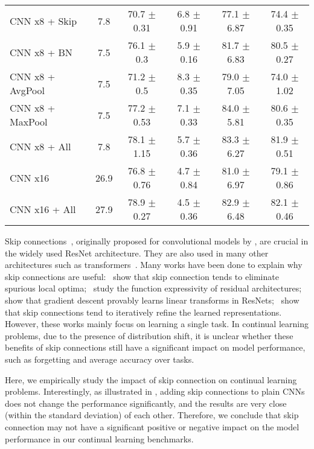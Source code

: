 \begin{table}[t]
{\begin{tabular}{@{}lccccc@{}}
CNN x8 + Skip & 7.8 & 70.7 $\pm$0.31 & 6.8 $\pm$0.91 & 77.1 $\pm$6.87 & 74.4 $\pm$0.35 \\
CNN x8 + BN & 7.5 & 76.1 $\pm$0.3 & 5.9 $\pm$0.16 & 81.7 $\pm$6.83 & 80.5 $\pm$0.27 \\
CNN x8 + AvgPool & 7.5 & 71.2 $\pm$0.5 & 8.3 $\pm$0.35 & 79.0 $\pm$7.05 & 74.0 $\pm$1.02 \\
CNN x8 + MaxPool & 7.5 & 77.2 $\pm$0.53 & 7.1 $\pm$0.33 & 84.0 $\pm$5.81 & 80.6 $\pm$0.35 \\
CNN x8 + All & 7.8 & 78.1 $\pm$1.15 & 5.7 $\pm$0.36 & 83.3 $\pm$6.27 & 81.9 $\pm$0.51 \\ \midrule
CNN x16 & 26.9 & 76.8 $\pm$0.76 & 4.7 $\pm$0.84 & 81.0 $\pm$6.97 & 79.1 $\pm$0.86 \\
CNN x16 + All & 27.9 & 78.9 $\pm$0.27 & 4.5 $\pm$0.36 & 82.9 $\pm$6.48 & 82.1 $\pm$0.46 \\ \bottomrule
\end{tabular}%
}
\negspace{-2mm}
\end{table}

Skip connections~\citep{Cho-Skip-DBM}, originally proposed for convolutional models by \citet{he2016deep}, are crucial in the widely used ResNet architecture. They are also used in many other architectures such as transformers~\citep{vaswani2017attention}. Many works have been done to explain why skip connections are useful:~\citet{hardt2016identity} show that skip connection tends to eliminate spurious local optima;~\citet{bartlett2018representing} study the function expressivity of residual architectures;~\citet{bartlett2018gradient} show that gradient descent provably learns linear transforms in ResNets;~\citet{jastrzkebski2017residual} show that skip connections tend to iteratively refine the learned representations. However, these works mainly focus on learning a single task. In continual learning problems, due to the presence of distribution shift, it is unclear whether these benefits of skip connections still have a significant impact on model performance, such as forgetting and average accuracy over tasks. 

Here, we empirically study the impact of skip connection on continual learning problems. Interestingly, as illustrated in , adding skip connections to plain CNNs does not change the performance significantly, and the results are very close (within the standard deviation) of each other. Therefore, we conclude that skip connection may not have a significant positive or negative impact on the model performance in our continual learning benchmarks.



